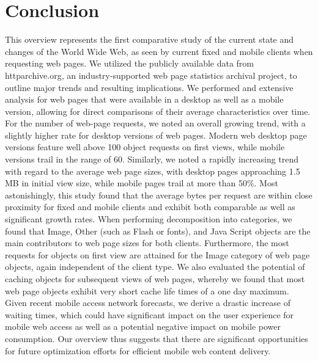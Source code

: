 \documentclass[onecolumn,12pt]{IEEEtran}
\begin{document}
\section{Conclusion}
\label{s:conc}
This overview represents the first comparative study of the current state and changes of the World Wide Web, as seen by current fixed and mobile clients when requesting web pages.
We utilized the publicly available data from httparchive.org, an industry-supported web page statistics archival project, to outline major trends and resulting implications.
We performed and extensive analysis for web pages that were available in a desktop as well as a mobile version, allowing for direct comparisons of their average characteristics over time.
For the number of web-page requests, we noted an overall growing trend, with a slightly higher rate for desktop versions of web pages. Modern web desktop page versions feature well above 100 object requests on first views, while mobile versions trail in the range of 60.
Similarly, we noted a rapidly increasing trend with regard to the average web page sizes, with desktop pages approaching 1.5 MB in initial view size, while mobile pages trail at more than 50\%.
Most astonishingly, this study found that the average bytes per request are within close proximity for fixed and mobile clients and exhibit both comparable as well as significant growth rates.
When performing decomposition into categories, we found that Image, Other (such as Flash or fonts), and Java Script objects are the main contributors to web page sizes for both clients. Furthermore, the most requests for objects on first view are attained for the Image category of web page objects, again independent of the client type.
We also evaluated the potential of caching objects for subsequent views of web pages, whereby we found that most web page objects exhibit very short cache life times of a one day maximum.
Given recent mobile access network forecasts, we derive a drastic increase of waiting times, which could have significant impact on the user experience for mobile web access as well as a potential negative impact on mobile power consumption.
Our overview thus suggests that there are significant opportunities for future optimization efforts for efficient mobile web content delivery.



\end{document}
